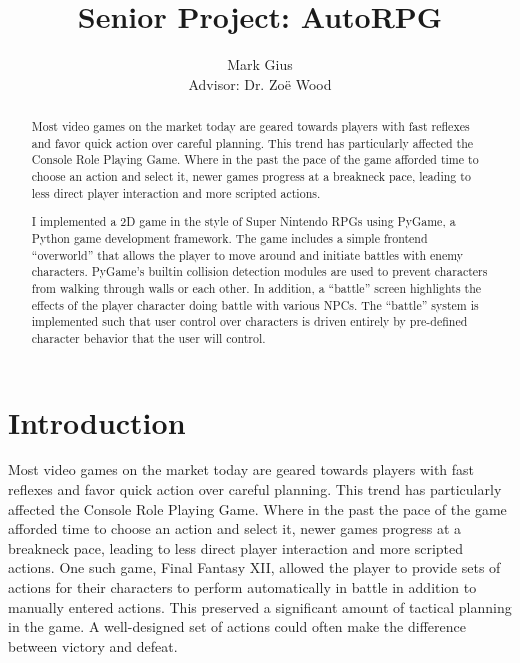 \documentclass[11pt]{article}
\begin{document}
\author{Mark Gius\vspace{10pt} \\
        Advisor: Dr. Zo\"e Wood
        }
\title{Senior Project: AutoRPG}
\maketitle

\begin{abstract}
Most video games on the market today are geared towards players with fast reflexes and favor quick action over careful planning. This trend has particularly affected the Console Role Playing Game.  Where in the past the pace of the game afforded time to choose an action and select it, newer games progress at a breakneck pace, leading to less direct player interaction and more scripted actions.

I implemented a 2D game in the style of Super Nintendo RPGs using PyGame, a Python game development framework.  The game includes a simple frontend ``overworld'' that allows the player to move around and initiate battles with enemy characters. PyGame's builtin collision detection modules are used to prevent characters from walking through walls or each other.  In addition, a ``battle'' screen highlights the effects of the player character doing battle with various NPCs. The ``battle'' system is implemented such that user control over characters is driven entirely by pre-defined character behavior that the user will control.

\end{abstract}

\doublespacing
\section{Introduction}

Most video games on the market today are geared towards players with fast reflexes and favor quick action over careful planning. This trend has particularly affected the Console Role Playing Game.  Where in the past the pace of the game afforded time to choose an action and select it, newer games progress at a breakneck pace, leading to less direct player interaction and more scripted actions.  One such game, Final Fantasy XII, allowed the player to provide sets of actions for their characters to perform automatically in battle in addition to manually entered actions. \cite{Gambits} This preserved a significant amount of tactical planning in the game. A well-designed set of actions could often make the difference between victory and defeat.
\end{document}
